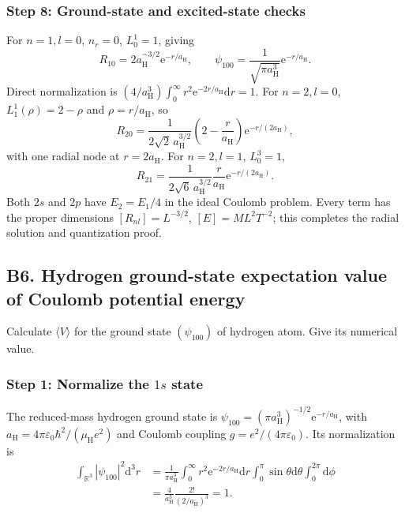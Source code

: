 \documentclass[11pt,a4paper]{article}
\newcommand{\dd}{\mathrm{d}}
\newcommand{\ee}{\mathrm{e}}
\newcommand{\R}{\mathbb R}
\newcommand{\aH}{a_{\mathrm H}}
\newcommand{\mH}{\mu_{\mathrm H}}
\newcommand{\eps}{\varepsilon_0}
\begin{document}
\subsubsection*{Step 8: Ground-state and excited-state checks}
For \(n=1,l=0\), \(n_r=0\), \(L_0^1=1\), giving
\begin{equation}\boxed{R_{10}=2\aH^{-3/2}\ee^{-r/\aH},\qquad\psi_{100}=\frac1{\sqrt{\pi\aH^3}}\ee^{-r/\aH}.}\end{equation}
Direct normalization is \((4/\aH^3)\int_0^\infty r^2\ee^{-2r/\aH}\dd r=1\). For \(n=2,l=0\), \(L_1^1(\rho)=2-\rho\) and \(\rho=r/\aH\), so
\begin{equation}R_{20}=\frac{1}{2\sqrt2\,\aH^{3/2}}\left(2-\frac r{\aH}\right)\ee^{-r/(2\aH)},\end{equation}
with one radial node at \(r=2\aH\). For \(n=2,l=1\), \(L_0^3=1\),
\begin{equation}R_{21}=\frac{1}{2\sqrt6\,\aH^{3/2}}\frac r{\aH}\ee^{-r/(2\aH)}.\end{equation}
Both \(2s\) and \(2p\) have \(E_2=E_1/4\) in the ideal Coulomb problem. Every term has the proper dimensions \([R_{nl}]=L^{-3/2}\), \([E]=ML^2T^{-2}\); this completes the radial solution and quantization proof.

\subsection{B6. Hydrogen ground-state expectation value of Coulomb potential energy}
\begin{questionbox}Calculate \(\langle V\rangle\) for the ground state \((\psi_{100})\) of hydrogen atom. Give its numerical value.\end{questionbox}
\subsubsection*{Step 1: Normalize the \texorpdfstring{$1s$}{1s} state}
The reduced-mass hydrogen ground state is \(\psi_{100}=(\pi\aH^3)^{-1/2}\ee^{-r/\aH}\), with \(\aH=4\pi\eps\hbar^2/(\mH e^2)\) and Coulomb coupling \(g=e^2/(4\pi\eps)\). Its normalization is
\begin{align}
\int_{\R^3}|\psi_{100}|^2\dd^3r&=\frac1{\pi\aH^3}\int_0^\infty r^2\ee^{-2r/\aH}\dd r\int_0^\pi\sin\theta\dd\theta\int_0^{2\pi}\dd\phi\\
&=\frac4{\aH^3}\frac{2!}{(2/\aH)^3}=1.
\end{align}
\end{document}
